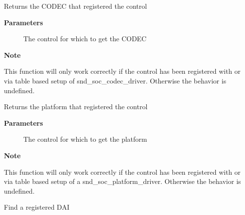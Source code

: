\documentclass[a4paper,8pt,english]{sphinxmanual}
\begin{document}
\begin{fulllineitems}
\label{sound/kernel-api/alsa-driver-api:c.snd_soc_kcontrol_codec}
Returns the CODEC that registered the control

\end{fulllineitems}


\textbf{Parameters}
\begin{description}
\item[{}] \leavevmode
The control for which to get the CODEC

\end{description}

\textbf{Note}

This function will only work correctly if the control has been
registered with {\hyperref[sound/kernel\string-api/alsa\string-driver\string-api:c.snd_soc_add_codec_controls]{\emph{}}} or via table based setup of
snd\_soc\_codec\_driver. Otherwise the behavior is undefined.

\begin{fulllineitems}
\label{sound/kernel-api/alsa-driver-api:c.snd_soc_kcontrol_platform}
Returns the platform that registered the control

\end{fulllineitems}


\textbf{Parameters}
\begin{description}
\item[{}] \leavevmode
The control for which to get the platform

\end{description}

\textbf{Note}

This function will only work correctly if the control has been
registered with {\hyperref[sound/kernel\string-api/alsa\string-driver\string-api:c.snd_soc_add_platform_controls]{\emph{}}} or via table based setup of
a snd\_soc\_platform\_driver. Otherwise the behavior is undefined.

\begin{fulllineitems}
\label{sound/kernel-api/alsa-driver-api:c.snd_soc_find_dai}
Find a registered DAI

\end{fulllineitems}
\end{document}
